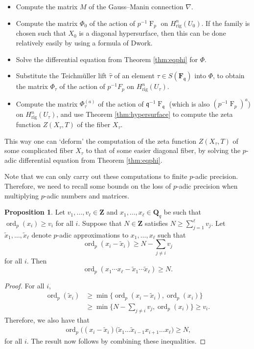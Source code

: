 \documentclass[a4paper,11pt]{article}
\numberwithin{equation}{section}
\newcommand{\ZZ}{\mathbf{Z}} %
\newcommand{\FF}{\mathbf{F}} %
\DeclareMathOperator{\ord}{ord}          %
\DeclareMathOperator{\Frob}{F}           %
\providecommand{\Hrig}{H_{\text{rig}}}  %
\theoremstyle{definition}
\newtheorem{prop}[thm]{Proposition}
\begin{document}
\begin{itemize}
\item Compute the matrix $M$ of the Gauss--Manin connection $\nabla$.
\item Compute the matrix $\Phi_0$ of the action of $p^{-1}\Frob_p$ on $\Hrig^n(U_0)$. If the
family is chosen such that $X_0$ is a diagonal hypersurface, then this can be done relatively
easily by using a formula of Dwork.
\item Solve the differential equation from Theorem \ref{thm:eqphi} for $\Phi$.
\item Substitute the Teichm\"uller lift $\hat{\tau}$ of an element $\tau \in S(\FF_{\mathfrak{q}})$
into $\Phi$,
to obtain the matrix $\Phi_{\tau}$ of the action of $p^{-1}F_p$ on $\Hrig^n(U_{\tau})$.
\item Compute the matrix $\Phi_{\tau}^{(a)}$ of the action of $\mathfrak{q}^{-1} \Frob_{\mathfrak{q}}$ (which is also $(p^{-1}\Frob_p)^a$) 
on $\Hrig^n(U_{\tau})$, and use Theorem \ref{thm:hypersurface} to compute the zeta function $Z(X_{\tau},T)$
of the fiber $X_{\tau}$.
\end{itemize}

This way one can `deform' the computation of the zeta function $Z(X_{\tau},T)$ of some complicated fiber $X_{\tau}$
to that of some easier diagonal fiber, by solving the $p$-adic differential equation from Theorem \ref{thm:eqphi}.

Note that we can only carry out these computations to finite $p$-adic precision. Therefore, we need to recall 
some bounds on the loss of $p$-adic precision when multiplying $p$-adic numbers and matrices. 

\begin{prop} \label{prop:productval}
Let $v_1,\ldots,v_{\ell} \in \ZZ$ and $x_1, \dotsc, x_{\ell} \in \mathbf{Q}_q$  
be such that $\ord_p(x_i) \geq v_i$ for all $i$. Suppose that $N \in \ZZ$ satisfies 
$N \geq \sum_{j=1}^{\ell} v_j$. Let $\tilde{x}_1, \dotsc, \tilde{x}_{\ell}$ denote 
$p$-adic approximations to $x_1, \dotsc, x_{\ell}$ such that 
\[
\ord_p(x_i - \tilde{x}_i) \geq N - \sum_{j \neq i} v_j
\] 
for all $i$.  Then 
\begin{equation*}
\ord_p(x_1 \dotsm x_{\ell} - \tilde{x}_1 \dotsm \tilde{x}_{\ell}) \geq N.
\end{equation*}
\end{prop}

\begin{proof}
For all $i$,
\begin{align*}
\ord_p(\tilde{x}_i) &\geq \min \{ \ord_p(x_i-\tilde{x}_i), \ord_p(x_i) \} \\
                    &\geq \min \{ N- \sum_{j \neq i} v_j, \ord_p(x_i)\} \geq v_i.
\end{align*}
Therefore, we also have that
\begin{align*}
\ord_p \bigl( (x_{i}-\tilde{x}_{i})(\tilde{x}_1 \dotsc \tilde{x}_{i-1} x_{i+1} \dotsc x_{\ell} \bigr) \geq N,
\end{align*}
for all $i$. The result now follows by combining these inequalities.
\end{proof}
\end{document}

